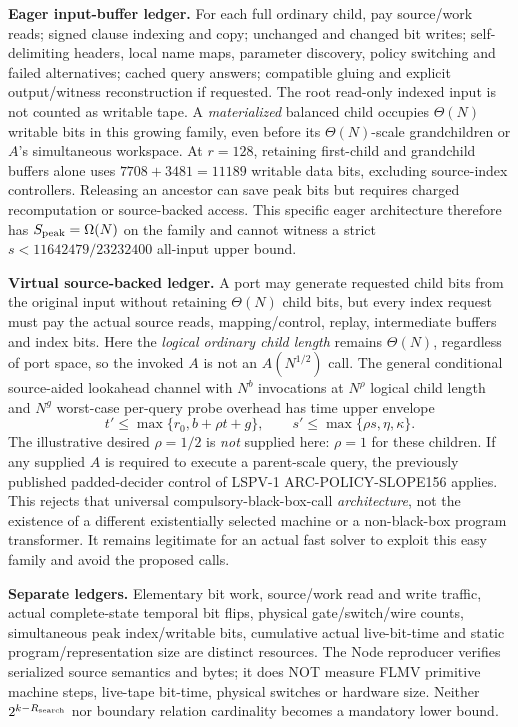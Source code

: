 \documentclass[11pt]{article}
\begin{document}
\noindent\textbf{Eager input-buffer ledger.}
For each full ordinary child, pay source/work reads; signed clause indexing and copy; unchanged and changed bit writes; self-delimiting headers, local name maps, parameter discovery, policy switching and failed alternatives; cached query answers; compatible gluing and explicit output/witness reconstruction if requested. The root read-only indexed input is not counted as writable tape. A \emph{materialized} balanced child occupies \(\Theta(N)\) writable bits in this growing family, even before its \(\Theta(N)\)-scale grandchildren or \(A\)'s simultaneous workspace. At \(r=128\), retaining first-child and grandchild buffers alone uses \(7708+3481=11189\) writable data bits, excluding source-index controllers. Releasing an ancestor can save peak bits but requires charged recomputation or source-backed access. This specific eager architecture therefore has \(S_{\rm peak}=\Omega(N)\) on the family and cannot witness a strict \(s<11642479/23232400\) all-input upper bound.

\noindent\textbf{Virtual source-backed ledger.}
A port may generate requested child bits from the original input without retaining \(\Theta(N)\) child bits, but every index request must pay the actual source reads, mapping/control, replay, intermediate buffers and index bits. Here the \emph{logical ordinary child length} remains \(\Theta(N)\), regardless of port space, so the invoked \(A\) is not an \(A(N^{1/2})\) call. The general conditional source-aided lookahead channel with \(N^b\) invocations at \(N^\rho\) logical child length and \(N^g\) worst-case per-query probe overhead has time upper envelope
\[
t'\le\max\{r_0,b+\rho t+g\},\qquad
s'\le\max\{\rho s,\eta,\kappa\}.
\]
The illustrative desired \(\rho=1/2\) is \emph{not} supplied here: \(\rho=1\) for these children. If any supplied \(A\) is required to execute a parent-scale query, the previously published padded-decider control of LSPV-1 ARC-POLICY-SLOPE156 applies. This rejects that universal compulsory-black-box-call \emph{architecture}, not the existence of a different existentially selected machine or a non-black-box program transformer. It remains legitimate for an actual fast solver to exploit this easy family and avoid the proposed calls.

\noindent\textbf{Separate ledgers.}
Elementary bit work, source/work read and write traffic, actual complete-state temporal bit flips, physical gate/switch/wire counts, simultaneous peak index/writable bits, cumulative actual live-bit-time and static program/representation size are distinct resources. The Node reproducer verifies serialized source semantics and bytes; it does NOT measure FLMV primitive machine steps, live-tape bit-time, physical switches or hardware size. Neither \(2^{k-R_{\rm search}}\) nor boundary relation cardinality becomes a mandatory lower bound.
\end{document}
